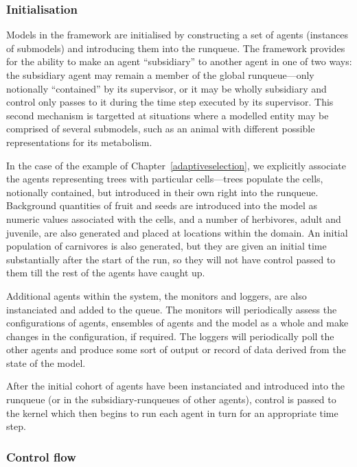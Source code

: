 \subsubsection{Initialisation}

Models in the framework are initialised by constructing a set of
agents (instances of submodels) and introducing them into the
runqueue. The framework provides for the ability to make an agent
``subsidiary'' to another agent in one of two ways: the subsidiary
agent may remain a member of the global runqueue---only notionally
``contained'' by its supervisor, or it may be wholly subsidiary and
control only passes to it during the time step executed by its
supervisor. This second mechanism is targetted at situations where a
modelled entity may be comprised of several submodels, such as an
animal with different possible representations for its metabolism. 

In the case of the example of Chapter~\ref{adaptiveselection}, we
explicitly associate the agents representing trees with particular
cells---trees populate the cells, notionally contained, but
introduced in their own right into the runqueue.  Background
quantities of fruit and seeds are introduced into the model as numeric
values associated with the cells, and a number of herbivores, adult
and juvenile, are also generated and placed at locations within the
domain. An initial population of carnivores is also generated, but
they are given an initial time substantially after the start of the
run, so they will not have control passed to them till the rest of the
agents have caught up.

Additional agents within the system, the monitors and loggers, are
also instanciated and added to the queue. The monitors will
periodically assess the configurations of agents, ensembles of agents
and the model as a whole and make changes in the configuration, if
required.  The loggers will periodically poll the other agents and
produce some sort of output or record of data derived from the state
of the model.

After the initial cohort of agents have been instanciated and
introduced into the runqueue (or in the subsidiary-runqueues of other
agents), control is passed to the kernel which then begins to run each
agent in turn for an appropriate time step.

\subsubsection{Control flow}


